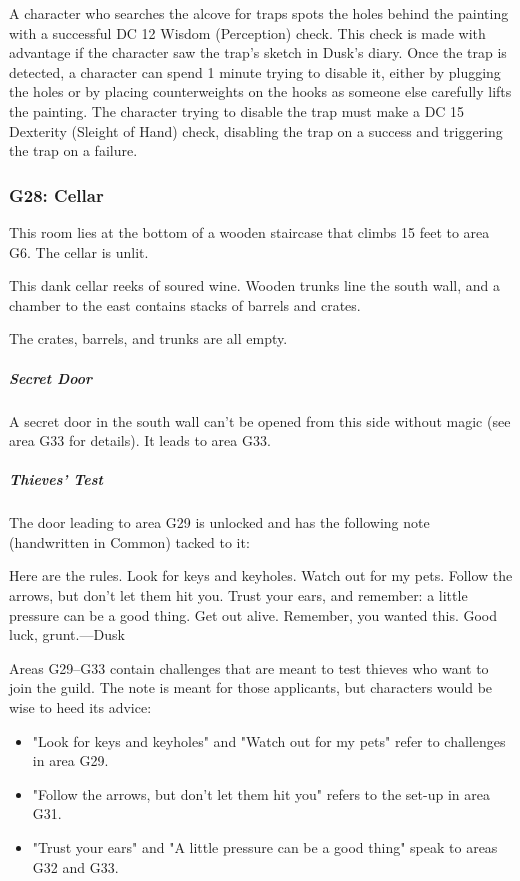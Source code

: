 \documentclass[10pt,a4paper,twoside,bg=print,twocolumn,openany,nodeprecatedcode]{dndbook}
\begin{document}
A character who searches the alcove for traps spots the holes behind the painting with a successful DC 12 Wisdom (Perception) check. This check is made with advantage if the character saw the trap's sketch in Dusk's diary. Once the trap is detected, a character can spend 1 minute trying to disable it, either by plugging the holes or by placing counterweights on the hooks as someone else carefully lifts the painting. The character trying to disable the trap must make a DC 15 Dexterity (Sleight of Hand) check, disabling the trap on a success and triggering the trap on a failure.

\subsubsection{G28: Cellar}
This room lies at the bottom of a wooden staircase that climbs 15 feet to area G6. The cellar is unlit.

\begin{DndReadAloud}{}
This dank cellar reeks of soured wine. Wooden trunks line the south wall, and a chamber to the east contains stacks of barrels and crates.

\end{DndReadAloud}

The crates, barrels, and trunks are all empty.

\subparagraph{Secret Door}
A secret door in the south wall can't be opened from this side without magic (see area G33 for details). It leads to area G33.

\subparagraph{Thieves' Test}
The door leading to area G29 is unlocked and has the following note (handwritten in Common) tacked to it:

\begin{DndReadAloud}{}
Here are the rules. Look for keys and keyholes. Watch out for my pets. Follow the arrows, but don't let them hit you. Trust your ears, and remember: a little pressure can be a good thing. Get out alive. Remember, you wanted this. Good luck, grunt.—Dusk

\end{DndReadAloud}

Areas G29–G33 contain challenges that are meant to test thieves who want to join the guild. The note is meant for those applicants, but characters would be wise to heed its advice:


\begin{itemize}
\item "Look for keys and keyholes" and "Watch out for my pets" refer to challenges in area G29.
\item "Follow the arrows, but don't let them hit you" refers to the set-up in area G31.
\item "Trust your ears" and "A little pressure can be a good thing" speak to areas G32 and G33.
\end{itemize}
\end{document}
